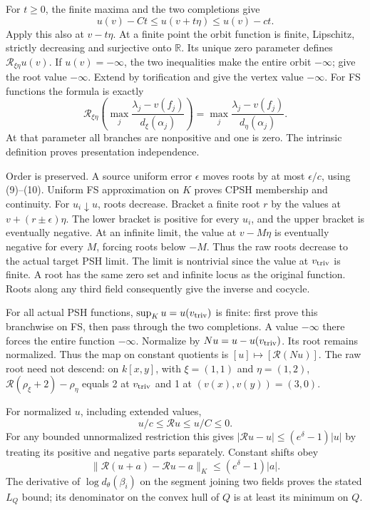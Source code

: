 \documentclass[
  10pt,
]{article}
\begin{document}
For \(t\geq0\), the finite maxima and the two completions give
\[ u(v)-Ct\leq u(v+t\eta)\leq u(v)-ct.                                                        \tag{10}\]
Apply this also at \(v-t\eta\). At a finite point the orbit function is
finite, Lipschitz, strictly decreasing and surjective onto
\(\mathbb R\). Its unique zero parameter defines
\(\mathcal R_{\xi\eta}u(v)\). If \(u(v)=-\infty\), the two inequalities
make the entire orbit \(-\infty\); give the root value \(-\infty\).
Extend by torification and give the vertex value \(-\infty\). For FS
functions the formula is exactly
\[ \mathcal R_{\xi\eta}\left(\max_j\frac{\lambda_j-v(f_j)}{d_\xi(\alpha_j)}\right)
       =\max_j\frac{\lambda_j-v(f_j)}{d_\eta(\alpha_j)}.                                     \tag{11}\]
At that parameter all branches are nonpositive and one is zero. The
intrinsic definition proves presentation independence.

Order is preserved. A source uniform error \(\epsilon\) moves roots by
at most \(\epsilon/c\), using (9)--(10). Uniform FS approximation on
\(K\) proves CPSH membership and continuity. For \(u_i\downarrow u\),
roots decrease. Bracket a finite root \(r\) by the values at
\(v+(r\pm\epsilon)\eta\). The lower bracket is positive for every
\(u_i\), and the upper bracket is eventually negative. At an infinite
limit, the value at \(v-M\eta\) is eventually negative for every \(M\),
forcing roots below \(-M\). Thus the raw roots decrease to the actual
target PSH limit. The limit is nontrivial since the value at
\(v_{\rm triv}\) is finite. A root has the same zero set and infinite
locus as the original function. Roots along any third field consequently
give the inverse and cocycle.

For all actual PSH functions, \(\sup_Ku=u(v_{\rm triv})\) is finite:
first prove this branchwise on FS, then pass through the two
completions. A value \(-\infty\) there forces the entire function
\(-\infty\). Normalize by \(Nu=u-u(v_{\rm triv})\). Its root remains
normalized. Thus the map on constant quotients is
\([u]\mapsto[\mathcal R(Nu)]\). The raw root need not descend: on
\(k[x,y]\), with \(\xi=(1,1)\) and \(\eta=(1,2)\),
\(\mathcal R(\rho_\xi+2)-\rho_\eta\) equals 2 at \(v_{\rm triv}\) and 1
at \((v(x),v(y))=(3,0)\).

For normalized \(u\), including extended values,
\[ u/c\leq\mathcal R u\leq u/C\leq0.                                                         \tag{12}\]
For any bounded unnormalized restriction this gives
\(|\mathcal R u-u|\leq(e^\delta-1)|u|\) by treating its positive and
negative parts separately. Constant shifts obey
\[ \|\mathcal R(u+a)-\mathcal R u-a\|_K\leq(e^\delta-1)|a|.                                  \tag{13}\]
The derivative of \(\log d_\theta(\beta_i)\) on the segment joining two
fields proves the stated \(L_Q\) bound; its denominator on the convex
hull of \(Q\) is at least its minimum on \(Q\).
\end{document}
